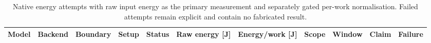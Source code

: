 \begin{table}[t]
\centering
\small
\caption{Native energy attempts with raw input energy as the primary measurement and separately gated per-work normalisation. Failed attempts remain explicit and contain no fabricated result.}
\label{tab:native-energy-observations}
\begin{tabular}{lrrrrrrrrrr}
\toprule
Model & Backend & Boundary & Setup & Status & Raw energy [J] & Energy/work [J] & Scope & Window & Claim & Failure \\
\midrule
\bottomrule
\end{tabular}
\end{table}
